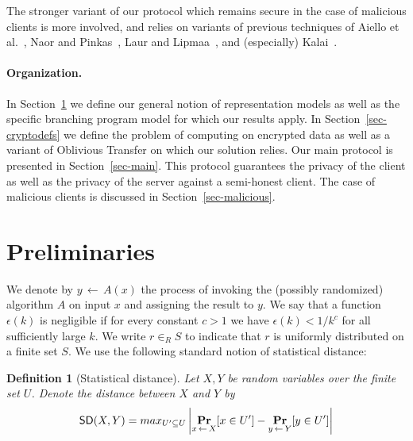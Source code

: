 \documentclass[11pt]{article}
\newtheorem{definition}[theorem]{Definition}
\newcommand{\from}{{\,\leftarrow\,}}
\newcommand{\eps}{{\epsilon}}
\newcommand{\SD}{{\sf SD }}
\newcommand{\emptyornot}[3]{\ifthenelse{\equal{#1}{}}{#2}{#3}}
\newcommand{\opbrange}[3][,]{#2#1\ldots#1#3}
\newcommand{\oprrange}[2][,]{#2#1\ldots}
\newcommand{\vars}[3][1]{\emptyornot{#3}{\oprrange[,]{{#2}_{#1}}}{\opbrange[,]{{#2}_{#1}}{{#2}_{#3}}}}
\newcommand{\commvars}{\vars{x}{n}}
\newcommand{\prob}[2][]{{\mathop{\mathbf{Pr}}_{#1}\!{\left[{#2}\right]}}}
\newcommand{\samp}[2]{#1\from #2}
\begin{document}
The stronger variant of our protocol which remains secure in the
case of malicious clients is more involved, and relies on variants
of previous techniques of Aiello et al.~\cite{AIR01}, Naor and
Pinkas~\cite{NP01}, Laur and Lipmaa~\cite{L05}, and (especially)
Kalai~\cite{T05}.


\paragraph{Organization.} In Section~\ref{sec-prel} we define our
general notion of representation models as well as the specific
branching program model for which our results apply. In
Section~\ref{sec-cryptodefs} we define the problem of computing on
encrypted data as well as a variant of Oblivious Transfer on which
our solution relies. Our main protocol is presented in
Section~\ref{sec-main}. This protocol guarantees the privacy of the
client as well as the privacy of the server against a semi-honest
client. The case of malicious clients is discussed in
Section~\ref{sec-malicious}.

\section{Preliminaries}
\label{sec-prel}


%
We denote by $y\from A(x)$ the process of invoking the (possibly
randomized) algorithm $A$ on input $x$ and assigning the result to
$y$. We say that a function $\eps(k)$ is negligible if for every
constant $c>1$ we have $\eps(k)<1/k^c$ for all sufficiently large
$k$. We write $r\in_R S$ to indicate that $r$ is uniformly
distributed on a finite set $S$.
We use the following standard notion of statistical distance:
\begin{definition}[Statistical distance]
Let $X,Y$ be random variables over the finite set $U$. Denote
the distance between $X$ and $Y$ by
\[\SD(X,Y)=max_{U'\subseteq{U}}
\left|\prob[\samp{x}{X}]{x\in{U'}}-\prob[\samp{y}{Y}]{y\in{U'}}\right|\]
\end{definition}
\end{document}
